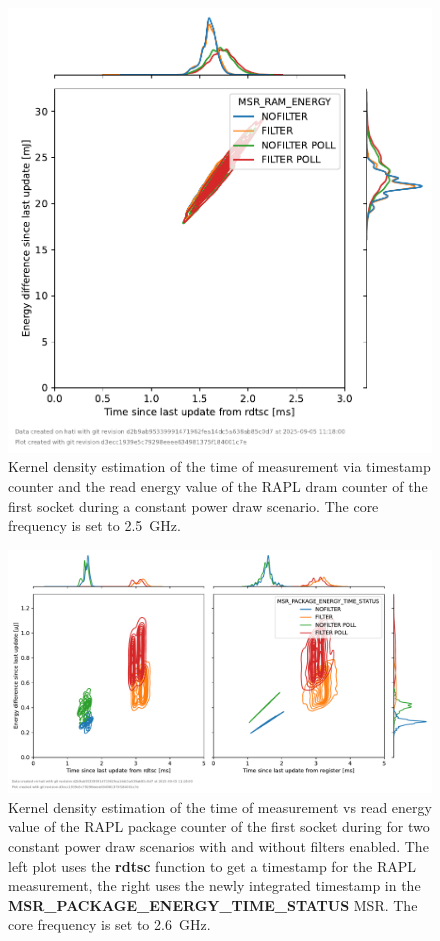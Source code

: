 \begin{figure}[]
    \centering
    \includegraphics[width=0.54\columnwidth]{fig/rapl-update-intervals/MSR_RAM_ENERGY_2500000.pdf}
    \caption{Kernel density estimation of the time of measurement via timestamp counter and the read energy value of the RAPL dram counter of the first socket during a constant power draw scenario.
    The core frequency is set to \SI{2.5}{\GHz}.}
\end{figure}

\clearpage
\begin{figure}[]
    \centering
    \includegraphics[width=\columnwidth]{fig/rapl-update-intervals/MSR_PACKAGE_ENERGY_TIME_STATUS_2600000.pdf}
    \caption{Kernel density estimation of the time of measurement vs read energy value of the RAPL package counter of the first socket during for two constant power draw scenarios with and without filters enabled.
    The left plot uses the \textbf{rdtsc} function to get a timestamp for the RAPL measurement, the right uses the newly integrated timestamp in the \textbf{MSR\_PACKAGE\_ENERGY\_TIME\_STATUS} MSR.
    The core frequency is set to \SI{2.6}{\GHz}.}
\end{figure}

